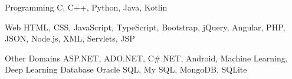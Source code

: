 

\begin{cvskills}

  \cvskill
    {Programming} %
    {C, C++, Python, Java, Kotlin} %

  \cvskill
    {Web} %
    {HTML, CSS, JavaScript, TypeScript, Bootstrap, jQuery, Angular, PHP, JSON, Node.js, XML, Servlets, JSP} %

  \cvskill
    {Other Domains} %
    {ASP.NET, ADO.NET, C\#.NET, Android, Machine Learning, Deep Learning} %
  \cvskill
    {Database} %
    {Oracle SQL, My SQL, MongoDB, SQLite } %
\end{cvskills}
